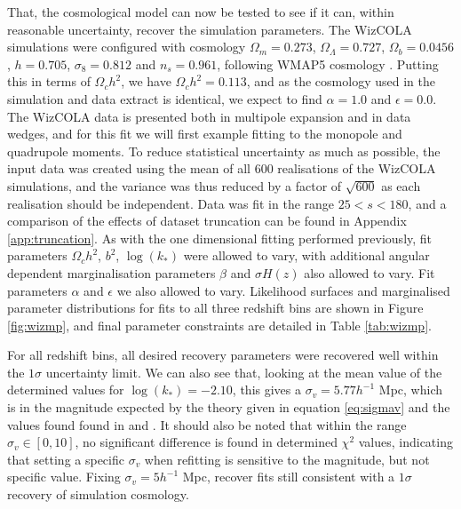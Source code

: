 \documentclass[titlesmallcaps, examinerscopy, copyrightpage]{uqthesis}
\begin{document}
That, the cosmological model can now be tested to see if it can, within reasonable uncertainty, recover the simulation parameters. The WizCOLA simulations were configured with cosmology $\Omega_m = 0.273$, $\Omega_\Lambda = 0.727$, $\Omega_b = 0.0456$, $h=0.705$, $\sigma_8 = 0.812$ and $n_s = 0.961$, following WMAP5 cosmology \citep{Komatsu2009}. Putting this in terms of $\Omega_c h^2$, we have $\Omega_c h^2 = 0.113$, and as the cosmology used in the simulation and data extract is identical, we expect to find $\alpha = 1.0$ and $\epsilon = 0.0$. The WizCOLA data is presented both in multipole expansion and in data wedges, and for this fit we will first example fitting to the monopole and quadrupole moments. To reduce statistical uncertainty as much as possible, the input data was created using the mean of all 600 realisations of the WizCOLA simulations, and the variance was thus reduced by a factor of  $\sqrt{600}$ as each realisation should be independent. Data was fit in the range $25<s<180$, and a comparison of the effects of dataset truncation can be found in Appendix \ref{app:truncation}. As with the one dimensional fitting performed previously, fit parameters $\Omega_c h^2$, $b^2$, $\log(k_*)$ were allowed to vary, with additional angular dependent marginalisation parameters $\beta$ and $\sigma H(z)$ also allowed to vary. Fit parameters $\alpha$ and $\epsilon$ we also allowed to vary. Likelihood surfaces and marginalised parameter distributions for fits to all three redshift bins are shown in Figure \ref{fig:wizmp}, and final parameter constraints are detailed in Table \ref{tab:wizmp}.

For all redshift bins, all desired recovery parameters were recovered well within the $1\sigma$ uncertainty limit. We can also see that, looking at the mean value of the determined values for $\log(k_*) = -2.10$, this gives a $\sigma_v = 5.77 h^{-1}$ Mpc, which  is in the magnitude expected by the theory given in equation \eqref{eq:sigmav} and the values found found in \citet{BlakeKazin2011} and \citet{BlakeDavis2011}. It should also be noted that within the range $\sigma_v \in [0,10]$, no significant difference is found in determined $\chi^2$ values, indicating that setting a specific $\sigma_v$ when refitting is sensitive to the magnitude, but not specific value. Fixing $\sigma_v = 5 h^{-1}$ Mpc, recover fits still consistent with a $1\sigma$ recovery of simulation cosmology.
\end{document}
